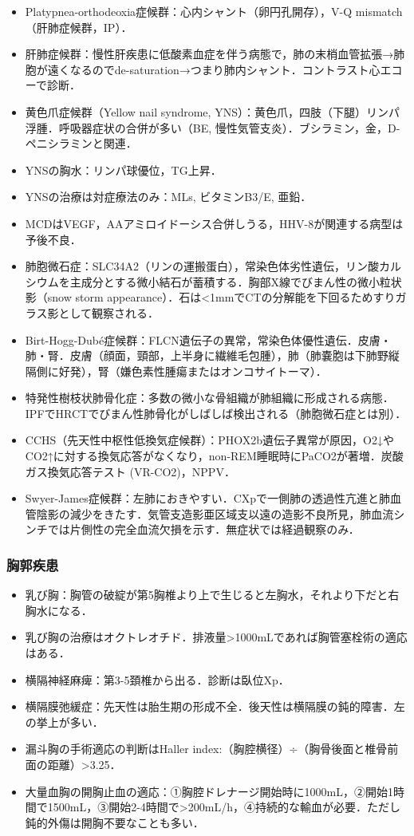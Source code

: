 \begin{itemize}
\item Platypnea-orthodeoxia症候群：心内シャント（卵円孔開存），V-Q mismatch（肝肺症候群，IP）．
\item 肝肺症候群：慢性肝疾患に低酸素血症を伴う病態で，肺の末梢血管拡張→肺胞が遠くなるのでde-saturation→つまり肺内シャント．コントラスト心エコーで診断．
\item 黄色爪症候群（Yellow nail syndrome, YNS）：黄色爪，四肢（下腿）リンパ浮腫．呼吸器症状の合併が多い（BE, 慢性気管支炎）．ブシラミン，金，D-ペニシラミンと関連．
\item YNSの胸水：リンパ球優位，TG上昇．
\item YNSの治療は対症療法のみ：MLs, ビタミンB3/E, 亜鉛．
\item MCDはVEGF，AAアミロイドーシス合併しうる，HHV-8が関連する病型は予後不良．
\item 肺胞微石症：SLC34A2（リンの運搬蛋白），常染色体劣性遺伝，リン酸カルシウムを主成分とする微小結石が蓄積する．胸部X線でびまん性の微小粒状影（snow storm appearance）．石は<1mmでCTの分解能を下回るためすりガラス影として観察される．
\item Birt-Hogg-Dubé症候群：FLCN遺伝子の異常，常染色体優性遺伝．皮膚・肺・腎．皮膚（顔面，頸部，上半身に繊維毛包腫），肺（肺嚢胞は下肺野縦隔側に好発），腎（嫌色素性腫瘍またはオンコサイトーマ）．
\item 特発性樹枝状肺骨化症：多数の微小な骨組織が肺組織に形成される病態．IPFでHRCTでびまん性肺骨化がしばしば検出される（肺胞微石症とは別）．
\item CCHS（先天性中枢性低換気症候群）：PHOX2b遺伝子異常が原因，O2↓やCO2↑に対する換気応答がなくなり，non-REM睡眠時にPaCO2が著増．炭酸ガス換気応答テスト (VR-CO2)，NPPV．
\item Swyer-James症候群：左肺におきやすい．CXpで一側肺の透過性亢進と肺血管陰影の減少をきたす．気管支造影亜区域支以遠の造影不良所見，肺血流シンチでは片側性の完全血流欠損を示す．無症状では経過観察のみ．
\end{itemize}


\subsubsection{胸郭疾患}

\begin{itemize}
\item 乳び胸：胸管の破綻が第5胸椎より上で生じると左胸水，それより下だと右胸水になる．
\item 乳び胸の治療はオクトレオチド．排液量>1000mLであれば胸管塞栓術の適応はある．
\item 横隔神経麻痺：第3-5頚椎から出る．診断は臥位Xp．
\item 横隔膜弛緩症：先天性は胎生期の形成不全．後天性は横隔膜の鈍的障害．左の挙上が多い．
\item 漏斗胸の手術適応の判断はHaller index:（胸腔横径）÷（胸骨後面と椎骨前面の距離）>3.25．
\item 大量血胸の開胸止血の適応：①胸腔ドレナージ開始時に1000mL，②開始1時間で1500mL，③開始2-4時間で>200mL/h，④持続的な輸血が必要．ただし鈍的外傷は開胸不要なことも多い．
\end{itemize}


